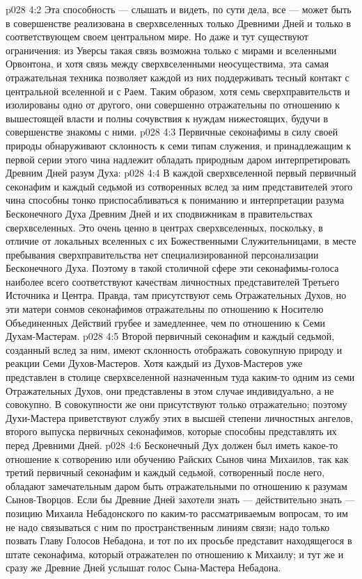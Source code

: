 \vs p028 4:2 Эта способность --- слышать и видеть, по сути дела, все --- может быть в совершенстве реализована в сверхвселенных только Древними Дней и только в соответствующем своем центральном мире. Но даже и тут существуют ограничения: из Уверсы такая связь возможна только с мирами и вселенными Орвонтона, и хотя связь между сверхвселенными неосуществима, эта самая отражательная техника позволяет каждой из них поддерживать тесный контакт с центральной вселенной и с Раем. Таким образом, хотя семь сверхправительств и изолированы одно от другого, они совершенно отражательны по отношению к вышестоящей власти и полны сочувствия к нуждам нижестоящих, будучи в совершенстве знакомы с ними.
\vs p028 4:3 \pc Первичные секонафимы в силу своей природы обнаруживают склонность к семи типам служения, и принадлежащим к первой серии этого чина надлежит обладать природным даром интерпретировать Древним Дней разум Духа:
\vs p028 4:4 \bibnobreakspace {} В каждой сверхвселенной первый первичный секонафим и каждый седьмой из сотворенных вслед за ним представителей этого чина способны тонко приспосабливаться к пониманию и интерпретации разума Бесконечного Духа Древним Дней и их сподвижникам в правительствах сверхвселенных. Это очень ценно в центрах сверхвселенных, поскольку, в отличие от локальных вселенных с их Божественными Служительницами, в месте пребывания сверхправительства нет специализированной персонализации Бесконечного Духа. Поэтому в такой столичной сфере эти секонафимы\hyp{}голоса наиболее всего соответствуют качествам личностных представителей Третьего Источника и Центра. Правда, там присутствуют семь Отражательных Духов, но эти матери сонмов секонафимов отражательны по отношению к Носителю Объединенных Действий грубее и замедленнее, чем по отношению к Семи Духам\hyp{}Мастерам.
\vs p028 4:5 \bibnobreakspace {} Второй первичный секонафим и каждый седьмой, созданный вслед за ним, имеют склонность отображать совокупную природу и реакции Семи Духов\hyp{}Мастеров. Хотя каждый из Духов\hyp{}Мастеров уже представлен в столице сверхвселенной назначенным туда каким\hyp{}то одним из семи Отражательных Духов, они представлены в этом случае индивидуально, а не совокупно. В совокупности же они присутствуют только отражательно; поэтому Духи\hyp{}Мастера приветствуют службу этих в высшей степени личностных ангелов, второго выпуска первичных секонафимов, которые способны представлять их перед Древними Дней.
\vs p028 4:6 \bibnobreakspace {} Бесконечный Дух должен был иметь какое\hyp{}то отношение к сотворению или обучению Райских Сынов чина Михаилов, так как третий первичный секонафим и каждый седьмой, сотворенный после него, обладают замечательным даром быть отражательными по отношению к разумам Сынов\hyp{}Творцов. Если бы Древние Дней захотели знать --- действительно знать --- позицию Михаила Небадонского по каким\hyp{}то рассматриваемым вопросам, то им не надо связываться с ним по пространственным линиям связи; надо только позвать Главу Голосов Небадона, и тот по их просьбе представит находящегося в штате секонафима, который отражателен по отношению к Михаилу; и тут же и сразу же Древние Дней услышат голос Сына\hyp{}Мастера Небадона.
